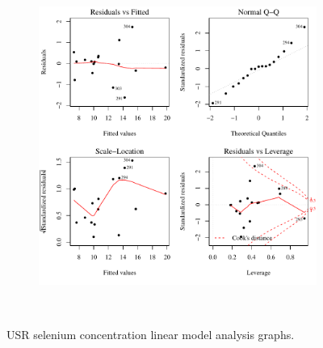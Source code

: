 \begin{landscape}
\begin{figure}
\begin{subfigure}{0.7\textwidth}
			\includegraphics[width=\tableCustomSize]{"Figures/Results_USR/Stochastic/Conc Model lm-fit CAN"}
		\end{subfigure}\\
		\caption{USR selenium concentration linear model analysis graphs.}
	\end{figure}
\end{landscape}

